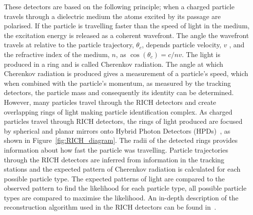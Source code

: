 These detectors are based on the following principle; when a charged particle travels through a dielectric medium the atoms excited by its passage are polarised. If the particle is travelling faster than the speed of light in the medium, the excitation energy is released as a coherent wavefront. The angle the wavefront travels at relative to the particle trajectory, $\theta_{c}$, depends particle velocity, $v$ , and the refractive index of the medium, $n$, as $\cos(\theta_{c}) = c/nv$. The light is produced in a ring and is called Cherenkov radiation. %
The angle at which Cherenkov radiation is produced gives a measurement of a particle’s speed, which when combined with the particle’s momentum, as measured by the tracking detectors, the particle mass and consequently its identity can be determined. However, many particles travel through the RICH detectors and create overlapping rings of light making particle identification complex. As charged particles travel through RICH detectors, the rings of light produced are focused by spherical and planar mirrors onto Hybrid Photon Detectors (HPDs)~\cite{Alemi:1999np}, as shown in Figure~\ref{fig:RICH_diagram}. The radii of the detected rings provides information about how fast the particle was travelling.
Particle trajectories through the RICH detectors are inferred from information in the tracking stations and the expected pattern of Cherenkov radiation is calculated for each possible particle type. The expected patterns of light are compared to the observed pattern to find the likelihood for each particle type, all possible particle types are compared to maximise the likelihood. An in-depth description of the reconstruction algorithm used in the RICH detectors can be found in~\cite{Forty:684714}. 

